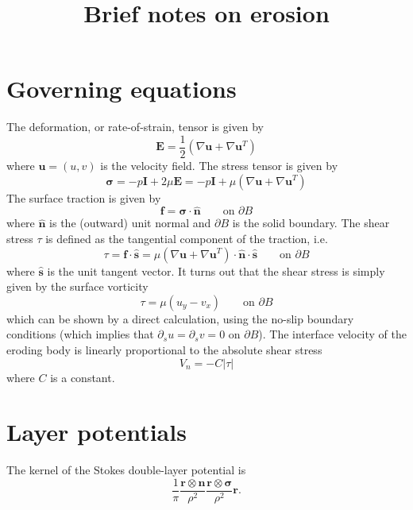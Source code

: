 \documentclass[11pt]{article}
\newcommand{\pdi}[2] { {\partial_#2} #1 }
\newcommand{\grad}{\nabla}
\newcommand{\bvec}[1]{\ensuremath{\boldsymbol{#1}}}
\newcommand{\abs}[1]{\left| #1 \right|}
\newcommand {\bu} {\bvec{u}}
\newcommand{\nhat}{\hat{\bvec{n}}}
\newcommand{\shat}{\hat{\bvec{s}}}
\newcommand{\Vn}{V_n}
\newcommand {\bdry} {\partial B}
\newcommand {\onBdry} {\text{on } \bdry }
\newcommand{\nn}{\mathbf{n}}
\newcommand{\rr}{\mathbf{r}}
\newcommand{\ssigma}{\boldsymbol{\sigma}}
\begin{document}
\title{Brief notes on erosion}
\author{}
\maketitle


\section{Governing equations}
The deformation, or rate-of-strain, tensor is given by
\begin{equation}
\bvec{E} = \frac{1}{2} \left( \grad \bu + \grad \bu^T \right)
\end{equation}
where $\bu = (u,v)$ is the velocity field. The stress tensor is given by
\begin{equation}
\bvec{\sigma} = -p \bvec{I} + 2 \mu \bvec{E} = -p \bvec{I} + \mu \left( \grad \bu + \grad \bu^T \right)
\end{equation}
The surface traction is given by
\begin{equation}
\bvec{f} = \bvec{\sigma} \cdot \nhat 	\qquad \onBdry
\end{equation}
where $\nhat$ is the (outward) unit normal and $\bdry$ is the solid
boundary. The shear stress $\tau$ is defined as the tangential
component of the traction, i.e.~
\begin{equation}
\tau = \bvec{f} \cdot \shat 
= \mu \left( \grad \bu + \grad \bu^T \right) \cdot \nhat \cdot \shat	\qquad \onBdry
\end{equation}
where $\shat$ is the unit tangent vector. It turns out that the shear
stress is simply given by the surface vorticity
\begin{equation}
\tau = \mu \left( u_y - v_x \right) \qquad \onBdry
\end{equation}
which can be shown by a direct calculation, using the no-slip boundary
conditions (which implies that $\pdi{u}{s} = \pdi{v}{s} = 0$ on
$\bdry$).  The interface velocity of the eroding body is linearly
proportional to the absolute shear stress
\begin{equation}
\Vn = -C \abs{\tau}
\end{equation}
where $C$ is a constant.


\section{Layer potentials}
The kernel of the Stokes double-layer potential is
\begin{equation}
  \frac{1}{\pi} \frac{\rr \otimes \nn}{\rho^{2}} 
  \frac{\rr \otimes \ssigma}{\rho^{2}} \rr.
\end{equation}
\end{document}

